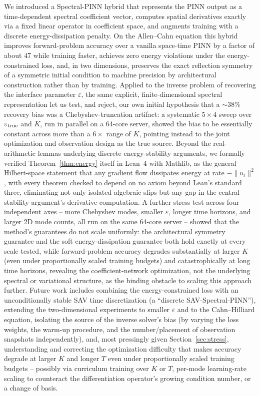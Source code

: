 \documentclass[symmetry,article,submit,moreauthors]{Definitions/mdpi}
\begin{document}
We introduced a Spectral-PINN hybrid that represents the PINN output as a time-dependent spectral coefficient vector, computes spatial derivatives exactly via a fixed linear operator in coefficient space, and augments training with a discrete energy-dissipation penalty. On the Allen--Cahn equation this hybrid improves forward-problem accuracy over a vanilla space-time PINN by a factor of about 47 while training faster, achieves zero energy violations under the energy-constrained loss, and, in two dimensions, preserves the exact reflection symmetry of a symmetric initial condition to machine precision by architectural construction rather than by training. Applied to the inverse problem of recovering the interface parameter $\varepsilon$, the same explicit, finite-dimensional spectral representation let us test, and reject, our own initial hypothesis that a $\sim38\%$ recovery bias was a Chebyshev-truncation artifact: a systematic $5\times4$ sweep over $\varepsilon_{\rm true}$ and $K$, run in parallel on a 64-core server, showed the bias to be essentially constant across more than a $6\times$ range of $K$, pointing instead to the joint optimization and observation design as the true source. Beyond the real-arithmetic lemmas underlying discrete energy-stability arguments, we formally verified Theorem~\ref{thm:energy} itself in Lean~4 with Mathlib, as the general Hilbert-space statement that any gradient flow dissipates energy at rate $-\|u_t\|^2$, with every theorem checked to depend on no axiom beyond Lean's standard three, eliminating not only isolated algebraic slips but any gap in the central stability argument's derivative computation. A further stress test across four independent axes -- more Chebyshev modes, smaller $\varepsilon$, longer time horizons, and larger 2D mode counts, all run on the same 64-core server -- showed that the method's guarantees do not scale uniformly: the architectural symmetry guarantee and the soft energy-dissipation guarantee both hold exactly at every scale tested, while forward-problem accuracy degrades substantially at larger $K$ (even under proportionally scaled training budgets) and catastrophically at long time horizons, revealing the coefficient-network optimization, not the underlying spectral or variational structure, as the binding obstacle to scaling this approach further. Future work includes combining the energy-constrained loss with an unconditionally stable SAV time discretization (a ``discrete SAV-Spectral-PINN''), extending the two-dimensional experiments to smaller $\varepsilon$ and to the Cahn--Hilliard equation, isolating the source of the inverse solver's bias (by varying the loss weights, the warm-up procedure, and the number/placement of observation snapshots independently), and, most pressingly given Section~\ref{sec:stress}, understanding and correcting the optimization difficulty that makes accuracy degrade at larger $K$ and longer $T$ even under proportionally scaled training budgets -- possibly via curriculum training over $K$ or $T$, per-mode learning-rate scaling to counteract the differentiation operator's growing condition number, or a change of basis.
\end{document}
